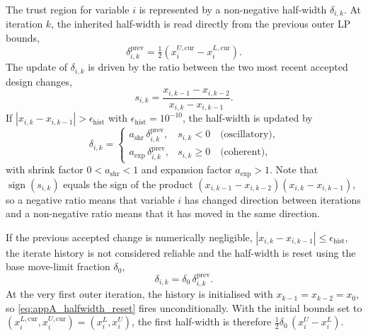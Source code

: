 The trust region for variable $i$ is represented by a non-negative
half-width $\delta_{i,k}$. At iteration $k$, the inherited
half-width is read directly from the previous outer LP bounds,
\begin{equation}
\label{eq:appA_prev_halfwidth}
    \delta_{i,k}^{\mathrm{prev}}
    =
    \tfrac{1}{2}
    \left(
        x_i^{U,\mathrm{cur}} - x_i^{L,\mathrm{cur}}
    \right) .
\end{equation}
The update of $\delta_{i,k}$ is driven by the ratio between the
two most recent accepted design changes,
\begin{equation}
\label{eq:appA_sign_ratio}
    s_{i,k}
    =
    \frac{x_{i,k-1}-x_{i,k-2}}{x_{i,k}-x_{i,k-1}} .
\end{equation}
If $|x_{i,k}-x_{i,k-1}|>\epsilon_{\mathrm{hist}}$ with
$\epsilon_{\mathrm{hist}}=10^{-10}$, the half-width is updated by
\begin{equation}
\label{eq:appA_halfwidth_update}
    \delta_{i,k}
    =
    \begin{cases}
        a_{\mathrm{shr}}\,\delta_{i,k}^{\mathrm{prev}},
            & s_{i,k} < 0 \quad \text{(oscillatory),}
        \\[2pt]
        a_{\mathrm{exp}}\,\delta_{i,k}^{\mathrm{prev}},
            & s_{i,k} \geq 0 \quad \text{(coherent),}
    \end{cases}
\end{equation}
with shrink factor $0<a_{\mathrm{shr}}<1$ and expansion factor
$a_{\mathrm{exp}}>1$. Note that $\operatorname{sign}(s_{i,k})$ equals
the sign of the product $(x_{i,k-1}-x_{i,k-2})(x_{i,k}-x_{i,k-1})$, so
a negative ratio means that variable $i$ has changed direction
between iterations and a non-negative ratio means that it has moved
in the same direction.

If the previous accepted change is numerically negligible,
$|x_{i,k}-x_{i,k-1}|\leq\epsilon_{\mathrm{hist}}$, the
iterate history is not considered reliable and the half-width is
reset using the base move-limit fraction $\delta_0$,
\begin{equation}
\label{eq:appA_halfwidth_reset}
    \delta_{i,k} = \delta_0\,\delta_{i,k}^{\mathrm{prev}} .
\end{equation}
At the very first outer iteration, the history is initialised with
$x_{k-1}=x_{k-2}=x_0$, so \autoref{eq:appA_halfwidth_reset} fires
unconditionally. With the initial bounds set to
$(x_i^{L,\mathrm{cur}},x_i^{U,\mathrm{cur}})=(x_i^L,x_i^U)$, the first
half-width is therefore $\tfrac{1}{2}\delta_0\,(x_i^U-x_i^L)$.

